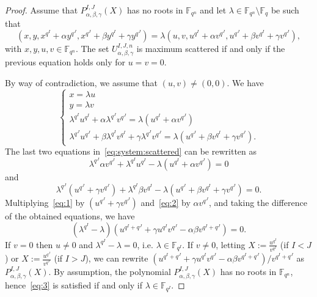 \documentclass[11pt]{article}
\theoremstyle{definition}
\numberwithin{equation}{section}
\begin{document}
\begin{proof}
Assume that $P^{I,J}_{\alpha,\beta,\gamma}(X)$ has no roots in $\mathbb{F}_{q^n}$ and let $\lambda \in \mathbb{F}_{q^n}\setminus \mathbb{F}_q$ be such that 
\begin{equation}
\label{eq:0}
    \left(x,y,x^{q^I}+\alpha y^{q^J},x^{q^J}+\beta y^{q^I} + \gamma y^{q^J}\right) = \lambda \left(u,v,u^{q^I}+\alpha v^{q^J},u^{q^J}+\beta v^{q^I} + \gamma v^{q^J}\right),
\end{equation}
with $x,y,u,v \in \mathbb{F}_{q^n}$.
The set $U_{\alpha, \beta, \gamma}^{I,J,n}$ is maximum scattered if and only if the previous equation holds only for $u=v=0$. 

By way of contradiction, we assume that $(u,v)\neq (0,0)$.  We have 
\begin{equation}
\label{eq:system:scattered}
    \begin{cases}
    x=\lambda u\\
    y = \lambda v\\
    \lambda^{q^I}u^{q^I} + \alpha\lambda^{q^J}v^{q^J} = \lambda\left(u^{q^I}+\alpha v^{q^J}\right)\\
    \lambda^{q^J}u^{q^J} + \beta\lambda^{q^I}v^{q^I} + \gamma\lambda^{q^J}v^{q^J} = \lambda\left(u^{q^J}+\beta v^{q^I} + \gamma v^{q^J}\right).
    \end{cases}
\end{equation}
The last two equations in~\eqref{eq:system:scattered} can be rewritten as 
\begin{equation}
\label{eq:1}
  \lambda^{q^J}\alpha v^{q^J} + \lambda^{q^I}u^{q^I} - \lambda\left(u^{q^I}+\alpha v^{q^J}\right) = 0 
\end{equation}
and
\begin{equation}
\label{eq:2}
 \lambda^{q^J}\left(u^{q^J} + \gamma v^{q^J}\right) + \lambda^{q^I}\beta v^{q^I} - \lambda\left(u^{q^J}+\beta v^{q^I} + \gamma v^{q^J}\right) = 0.
\end{equation}
Multiplying~\eqref{eq:1} by $\left(u^{q^J} + \gamma v^{q^J}\right)$ and~\eqref{eq:2} by $\alpha v^{q^J}$, and taking the difference of the obtained equations, we have 
\begin{equation}
\label{eq:3}
    \left(\lambda^{q^I} - \lambda\right)\left(u^{q^I + q^J} + \gamma u^{q^I}v^{q^J} - \alpha\beta v^{q^I + q^J}\right) = 0.
\end{equation}
If $v=0$ then $u\neq 0$ and $\lambda^{q^I} - \lambda=0$, i.e. $\lambda \in \mathbb{F}_{q^I}$. If $v\neq 0$, letting $X:=\frac{u^{q^I}}{v^{q^I}}$ (if $I < J$) or $X:=\frac{u^{q^J}}{v^{q^J}}$ (if $I > J$), we can rewrite $ (u^{q^I + q^J} + \gamma u^{q^I}v^{q^J} - \alpha\beta v^{q^I + q^J} )/v^{q^I+q^J}$ as $P^{I,J}_{\alpha,\beta,\gamma}(X)$.
By assumption, the  polynomial $P^{I,J}_{\alpha,\beta,\gamma}(X)$ has no roots in $\mathbb{F}_{q^n}$, hence~\eqref{eq:3} is satisfied if and only if $\lambda\in \mathbb{F}_{q^I}$.




\end{proof}
\end{document}
